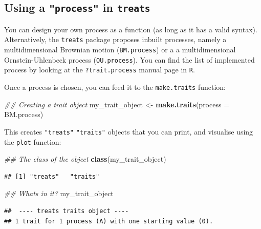 \documentclass[
]{book}
\newenvironment{Shaded}{\begin{snugshade}}{\end{snugshade}}
\newcommand{\CommentTok}[1]{\textcolor[rgb]{0.56,0.35,0.01}{\textit{#1}}}
\newcommand{\DataTypeTok}[1]{\textcolor[rgb]{0.13,0.29,0.53}{#1}}
\newcommand{\KeywordTok}[1]{\textcolor[rgb]{0.13,0.29,0.53}{\textbf{#1}}}
\newcommand{\NormalTok}[1]{#1}
\newcommand{\StringTok}[1]{\textcolor[rgb]{0.31,0.60,0.02}{#1}}
\begin{document}
\hypertarget{using-a-process-in-treats}{%
\subsection{\texorpdfstring{Using a \texttt{"process"} in \texttt{treats}}{Using a "process" in treats}}\label{using-a-process-in-treats}}

You can design your own process as a function (as long as it has a valid syntax).
Alternatively, the \texttt{treats} package proposes inbuilt processes, namely a multidimensional Brownian motion (\texttt{BM.process}) or a a multidimensional Ornstein-Uhlenbeck process (\texttt{OU.process}).
You can find the list of implemented process by looking at the \texttt{?trait.process} manual page in \texttt{R}.

Once a process is chosen, you can feed it to the \texttt{make.traits} function:

\begin{Shaded}
\begin{Highlighting}[]
\CommentTok{\#\# Creating a trait object}
\NormalTok{my\_trait\_object \textless{}{-}}\StringTok{ }\KeywordTok{make.traits}\NormalTok{(}\DataTypeTok{process =}\NormalTok{ BM.process)}
\end{Highlighting}
\end{Shaded}

This creates \texttt{"treats"} \texttt{"traits"} objects that you can print, and visualise using the \texttt{plot} function:

\begin{Shaded}
\begin{Highlighting}[]
\CommentTok{\#\# The class of the object}
\KeywordTok{class}\NormalTok{(my\_trait\_object)}
\end{Highlighting}
\end{Shaded}

\begin{verbatim}
## [1] "treats"   "traits"
\end{verbatim}

\begin{Shaded}
\begin{Highlighting}[]
\CommentTok{\#\# What\textquotesingle{}s in it?}
\NormalTok{my\_trait\_object}
\end{Highlighting}
\end{Shaded}

\begin{verbatim}
##  ---- treats traits object ---- 
## 1 trait for 1 process (A) with one starting value (0).
\end{verbatim}
\end{document}
